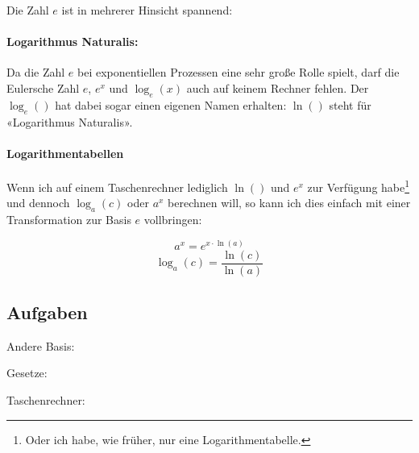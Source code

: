 Die Zahl $e$ ist in mehrerer Hinsicht spannend:

\paragraph{Logarithmus Naturalis:} Da die
Zahl $e$ bei exponentiellen Prozessen eine sehr große Rolle spielt,
darf die Eulersche Zahl $e$, $e^x$ und $\log_e(x)$ auch auf keinem Rechner fehlen. Der $\log_e()$ hat dabei sogar einen eigenen Namen erhalten:
$\ln()$ steht für «Logarithmus Naturalis».

\begin{center}
\end{center}

\paragraph{Logarithmentabellen}
Wenn ich auf einem Taschenrechner lediglich $\ln()$ und $e^x$ zur Verfügung habe\footnote{Oder ich habe, wie früher, nur eine Logarithmentabelle.} und dennoch $\log_a(c)$ oder $a^x$ berechnen will, so kann ich dies einfach mit einer Transformation zur Basis $e$ vollbringen:

$$a^x = e^{x\cdot{}\ln(a)}$$
$$\log_a(c) = \frac{\ln(c)}{\ln(a)}$$

\newpage




\subsection*{Aufgaben}

Andere Basis:


Gesetze:


Taschenrechner:

